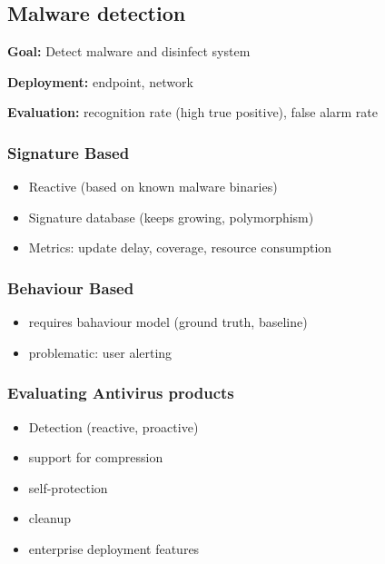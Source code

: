 \documentclass[english, leagacyboxes, nologo]{latex4ei/latex4ei_sheet}
\begin{document}
{  \subsection{Malware detection}

  \textbf{Goal:} Detect malware and disinfect system

  \textbf{Deployment:} endpoint, network

  \textbf{Evaluation:} recognition rate (high true positive), false alarm rate


  \subsubsection{Signature Based}
  \begin{itemize}
    \item Reactive (based on known malware binaries)
    \item Signature database (keeps growing, polymorphism)
    \item Metrics: update delay, coverage, resource consumption
   \end{itemize}

     \subsubsection{Behaviour Based}
  \begin{itemize}
    \item requires bahaviour model (ground truth, baseline)
    \item problematic: user alerting
   \end{itemize}

   \subsubsection{Evaluating Antivirus products}

   \begin{itemize}
      \item Detection (reactive, proactive)
      \item support for compression
      \item self-protection
      \item cleanup
      \item enterprise deployment features
    \end{itemize}
  }  \sectionbox{
}
\end{document}

